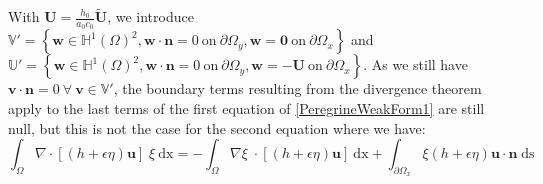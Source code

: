\documentclass[11pt,a4paper]{article}
\begin{document}
				With $\mathbf{U} = \frac{h_0}{a_0 c_0} \mathbf{\tilde{U}}$, we introduce  $\mathbb{V}' = \left\lbrace \mathbf{w} \in \mathbb{H}^1(\Omega)^2, \mathbf{w} \cdot \mathbf{n} = 0 \: \mathrm{on} \: \partial \Omega_y, \mathbf{w} = \mathbf{0} \: \mathrm{on} \: \partial \Omega_x\right\rbrace $ and $\mathbb{U}' = \left\lbrace \mathbf{w} \in \mathbb{H}^1(\Omega)^2, \mathbf{w} \cdot \mathbf{n} = 0 \: \mathrm{on} \: \partial \Omega_y, \mathbf{w} = -\mathbf{U} \: \mathrm{on} \: \partial \Omega_x\right\rbrace $. As we still have $\mathbf{v} \cdot \mathbf{n} = 0 \: \forall \: \mathbf{v} \in \mathbb{V}'$, the boundary terms resulting from the divergence theorem apply to the last terms of the first equation of \eqref{PeregrineWeakForm1} are still null, but this is not the case for the second equation where we have: 
				\begin{equation}
					\int_{\Omega}\! \nabla \cdot [(h+\epsilon\eta) \mathbf{u}] \; \xi \: \mathrm{dx} = - \int_{\Omega}\! \nabla \xi \; \cdot [(h+\epsilon\eta) \mathbf{u}]  \: \mathrm{dx} + \int_{\partial \Omega_x} \! \xi (h+\epsilon \eta) \mathbf{u} \cdot \mathbf{n} \; \mathrm{ds}
				\end{equation}				
			
	\pagebreak
	
\end{document}
